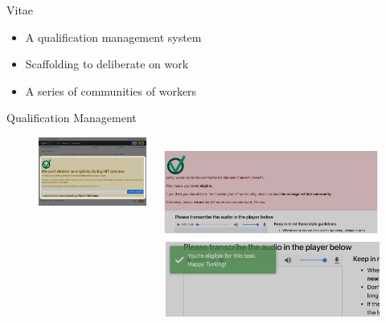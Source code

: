 \documentclass[presentation]{subfiles}
\begin{document}
\begin{frame}{Vitae}
  \begin{itemize}
    \item A qualification management system
    \item Scaffolding to deliberate on work
    \item A series of communities of workers
  \end{itemize}
\end{frame}


\begin{frame}{Qualification Management}
\begin{figure}
  \begin{columns}
  \begin{column}{0.45\textwidth}
  \includegraphics[width=\textwidth]{../common_figures/vitae/unknown.png}
  \end{column}
  \begin{column}{0.45\textwidth}
  \includegraphics[width=\textwidth]{../common_figures/vitae/rejected.png}
  \vspace{4mm}
  \includegraphics[width=\textwidth]{../common_figures/vitae/eligible.png}
  \end{column}
  \end{columns}
  \end{figure}
\end{frame}
\end{document}
